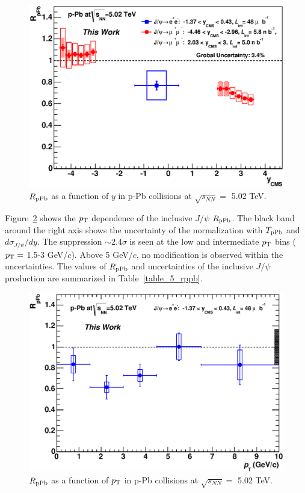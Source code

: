 \begin{figure}[!h]
  \centering
  \includegraphics[width=12cm]{chap5/figure/RpPb/RpPb_MB_y_bin2_tw.eps}
  \caption{$R_{\rm{pPb}}$ as a function of $y$ in p-Pb collisions at $\sqrt{s_{NN}}=$ 5.02 TeV.}
  \label{fig_5_rppby}
\end{figure}

Figure~\ref{fig_5_rppbpt} shows the $p_{\rm{T}}$ dependence of the inclusive $J/\psi$ $R_{\rm{pPb}}$. 
The black band around the right axis shows the uncertainty of the normalization with $T_{\rm{pPb}}$ and $d\sigma_{J/\psi}/dy$. 
The suppression $\sim 2.4\sigma$ is seen at the low and intermediate $p_{\rm{T}}$ bins ($p_{\rm{T}}=$ 1.5-3 GeV/$c$).
Above 5 GeV/$c$, no modification is observed within the uncertainties.  
The values of $R_{\rm{pPb}}$ and uncertainties of the inclusive $J/\psi$ production are summarized in Table~\ref{table_5_rppb}.
\begin{figure}[!h]
  \centering
  \includegraphics[width=12cm]{chap5/figure/RpPb/RpPb_MB_Pt_bin2_tw.eps}
  \caption{$R_{\rm{pPb}}$ as a function of $p_{\rm{T}}$ in p-Pb collisions at $\sqrt{s_{NN}}=$ 5.02 TeV.}
  \label{fig_5_rppbpt}
\end{figure}

